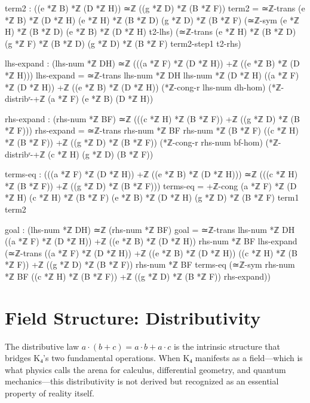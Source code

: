 \documentclass[11pt,a4paper]{book}
\begin{document}
\begin{code}
    term2 : ((e *ℤ B) *ℤ (D *ℤ H)) ≃ℤ ((g *ℤ D) *ℤ (B *ℤ F))
    term2 = ≃ℤ-trans {(e *ℤ B) *ℤ (D *ℤ H)} {(e *ℤ H) *ℤ (B *ℤ D)} {(g *ℤ D) *ℤ (B *ℤ F)}
              (≃ℤ-sym {(e *ℤ H) *ℤ (B *ℤ D)} {(e *ℤ B) *ℤ (D *ℤ H)} t2-lhs)
              (≃ℤ-trans {(e *ℤ H) *ℤ (B *ℤ D)} {(g *ℤ F) *ℤ (B *ℤ D)} {(g *ℤ D) *ℤ (B *ℤ F)} term2-step1 t2-rhs)

    lhs-expand : (lhs-num *ℤ DH) ≃ℤ (((a *ℤ F) *ℤ (D *ℤ H)) +ℤ ((e *ℤ B) *ℤ (D *ℤ H)))
    lhs-expand = ≃ℤ-trans {lhs-num *ℤ DH} {lhs-num *ℤ (D *ℤ H)} 
                  {((a *ℤ F) *ℤ (D *ℤ H)) +ℤ ((e *ℤ B) *ℤ (D *ℤ H))}
                  (*ℤ-cong-r lhs-num dh-hom)
                  (*ℤ-distribʳ-+ℤ (a *ℤ F) (e *ℤ B) (D *ℤ H))

    rhs-expand : (rhs-num *ℤ BF) ≃ℤ (((c *ℤ H) *ℤ (B *ℤ F)) +ℤ ((g *ℤ D) *ℤ (B *ℤ F)))
    rhs-expand = ≃ℤ-trans {rhs-num *ℤ BF} {rhs-num *ℤ (B *ℤ F)}
                  {((c *ℤ H) *ℤ (B *ℤ F)) +ℤ ((g *ℤ D) *ℤ (B *ℤ F))}
                  (*ℤ-cong-r rhs-num bf-hom)
                  (*ℤ-distribʳ-+ℤ (c *ℤ H) (g *ℤ D) (B *ℤ F))

    terms-eq : (((a *ℤ F) *ℤ (D *ℤ H)) +ℤ ((e *ℤ B) *ℤ (D *ℤ H))) ≃ℤ 
               (((c *ℤ H) *ℤ (B *ℤ F)) +ℤ ((g *ℤ D) *ℤ (B *ℤ F)))
    terms-eq = +ℤ-cong {(a *ℤ F) *ℤ (D *ℤ H)} {(c *ℤ H) *ℤ (B *ℤ F)}
                       {(e *ℤ B) *ℤ (D *ℤ H)} {(g *ℤ D) *ℤ (B *ℤ F)}
                       term1 term2

    goal : (lhs-num *ℤ DH) ≃ℤ (rhs-num *ℤ BF)
    goal = ≃ℤ-trans {lhs-num *ℤ DH} 
             {((a *ℤ F) *ℤ (D *ℤ H)) +ℤ ((e *ℤ B) *ℤ (D *ℤ H))}
             {rhs-num *ℤ BF}
             lhs-expand
             (≃ℤ-trans {((a *ℤ F) *ℤ (D *ℤ H)) +ℤ ((e *ℤ B) *ℤ (D *ℤ H))}
                       {((c *ℤ H) *ℤ (B *ℤ F)) +ℤ ((g *ℤ D) *ℤ (B *ℤ F))}
                       {rhs-num *ℤ BF}
                       terms-eq
                       (≃ℤ-sym {rhs-num *ℤ BF} 
                               {((c *ℤ H) *ℤ (B *ℤ F)) +ℤ ((g *ℤ D) *ℤ (B *ℤ F))}
                               rhs-expand))
\end{code}


\chapter{Field Structure: Distributivity}
\label{chap:distributivity}

The distributive law $a \cdot (b + c) = a \cdot b + a \cdot c$ is the intrinsic structure that bridges K₄'s two fundamental operations. When K₄ manifests as a field—which is what physics calls the arena for calculus, differential geometry, and quantum mechanics—this distributivity is not derived but recognized as an essential property of reality itself.
\end{document}
